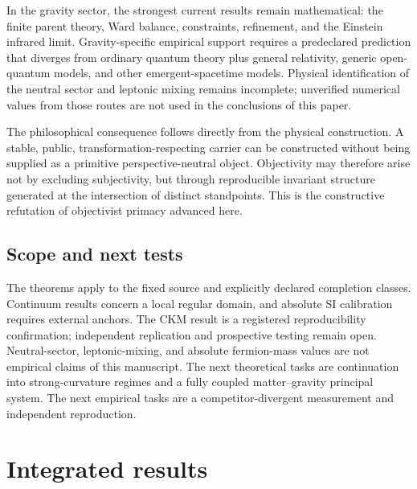 \documentclass[11pt]{article}
\theoremstyle{definition}
\theoremstyle{remark}
\begin{document}
In the gravity sector, the strongest current results remain mathematical: the finite parent theory, Ward balance, constraints, refinement, and the Einstein infrared limit. Gravity-specific empirical support requires a predeclared prediction that diverges from ordinary quantum theory plus general relativity, generic open-quantum models, and other emergent-spacetime models. Physical identification of the neutral sector and leptonic mixing remains incomplete; unverified numerical values from those routes are not used in the conclusions of this paper.

The philosophical consequence follows directly from the physical construction. A stable, public, transformation-respecting carrier can be constructed without being supplied as a primitive perspective-neutral object. Objectivity may therefore arise not by excluding subjectivity, but through reproducible invariant structure generated at the intersection of distinct standpoints. This is the constructive refutation of objectivist primacy advanced here.

\subsection{Scope and next tests}

The theorems apply to the fixed source and explicitly declared completion classes. Continuum results concern a local regular domain, and absolute SI calibration requires external anchors. The CKM result is a registered reproducibility confirmation; independent replication and prospective testing remain open. Neutral-sector, leptonic-mixing, and absolute fermion-mass values are not empirical claims of this manuscript. The next theoretical tasks are continuation into strong-curvature regimes and a fully coupled matter--gravity principal system. The next empirical tasks are a competitor-divergent measurement and independent reproduction.

\section{Integrated results}
\end{document}
